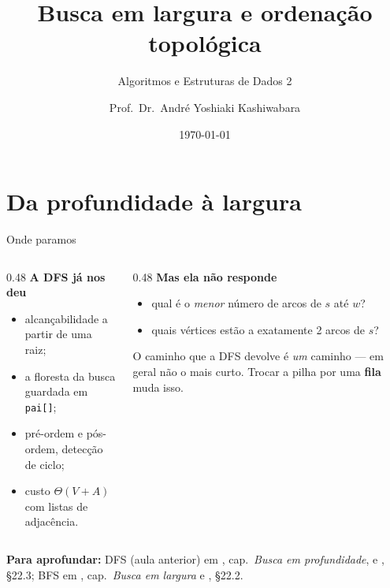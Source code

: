 \documentclass[aspectratio=169]{beamer}
\title{Busca em largura e ordenação topológica}
\subtitle{Algoritmos e Estruturas de Dados 2}
\author[André Y. Kashiwabara <andreyoshiaki@dcomp.ufs.br>]{Prof.\ Dr.\ André Yoshiaki Kashiwabara}
\institute{Departamento de Computação --- Universidade Federal de Sergipe}
\date{\today}
\newcommand{\fonte}[1]{%
  \vfill
  {\tiny\color{gray!55!black}\textbf{Para aprofundar:} #1\par}%
}
\begin{document}
\begin{frame}
  \titlepage
\end{frame}

\section{Da profundidade à largura}

\begin{frame}{Onde paramos}
  \begin{columns}[T]
    \begin{column}{0.48\textwidth}
      \textbf{A DFS já nos deu}

      \medskip
      {\small
      \begin{itemize}\scriptsize
        \item alcançabilidade a partir de uma raiz;
        \item a floresta da busca guardada em \texttt{pai[]};
        \item pré-ordem e pós-ordem, detecção de ciclo;
        \item custo $\Theta(V+A)$ com listas de adjacência.
      \end{itemize}}
    \end{column}
    \begin{column}{0.48\textwidth}
      \textbf{Mas ela não responde}

      \medskip
      {\small
      \begin{itemize}\scriptsize
        \item qual é o \emph{menor} número de arcos de $s$ até $w$?
        \item quais vértices estão a exatamente 2 arcos de $s$?
      \end{itemize}
      O caminho que a DFS devolve é \emph{um} caminho --- em geral não o
      mais curto. Trocar a pilha por uma \textbf{fila} muda isso.}
    \end{column}
  \end{columns}
  \fonte{DFS (aula anterior) em \cite{feofiloff2020algoritmos}, cap.\
  \emph{Busca em profundidade}, e \cite{cormen2009introduction}, §22.3;
  BFS em \cite{feofiloff2020algoritmos}, cap.\ \emph{Busca em largura} e \cite{cormen2009introduction}, §22.2.}
\end{frame}
\end{document}

